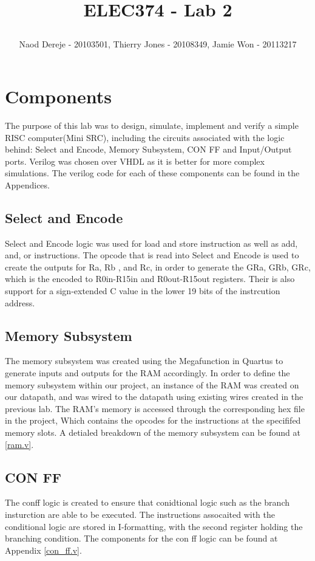 \documentclass{article}
\title{
    \begin{large}
        ELEC374 - Lab 2
    \end{large}
}
\author{Naod Dereje - 20103501, Thierry Jones - 20108349, Jamie Won - 20113217}
\begin{document}
\maketitle
\cleardoublepage
\tableofcontents
\cleardoublepage


\section{Components}
    The purpose of this lab was to design, simulate, implement and verify a simple RISC computer(Mini SRC), including the circuits associated with the logic behind: 
    Select and Encode, Memory Subsystem, CON FF and Input/Output ports. Verilog was chosen over VHDL as it is better for more complex simulations. The verilog code 
    for each of these components can be found in the Appendices.
    
    \subsection{Select and Encode}
    Select and Encode logic was used for load and store instruction as well as add, and, or instructions. The opcode that is read into Select and Encode is used to create the outputs for Ra, Rb , and Rc, in order to generate the GRa, GRb, GRc, which is the encoded to R0in-R15in and R0out-R15out registers. Their is also support for a sign-extended C value in the lower 19 bits of the instrcution address.

    \subsection{Memory Subsystem}
    The memory subsystem was created using the Megafunction in Quartus to generate inputs and outputs for the RAM accordingly. In order to define the memory subsystem within our project, an instance of the RAM was created on our datapath, and was wired to the datapath using existing wires created in the previous lab. The RAM's memory is accessed through the corresponding hex file in the project, Which contains the opcodes for the instructions at the specififed memory slots. A detialed breakdown of the memory subsystem can be found at \ref{ram.v}.

    \subsection{CON FF}
    The conff logic is created to ensure that conidtional logic such as the branch insturction are able to be executed. The instructions assocaited with the conditional logic are stored in I-formatting, with the second register holding the branching condition. The components for the con ff logic can be found at Appendix \ref{con_ff.v}.
\end{document}
